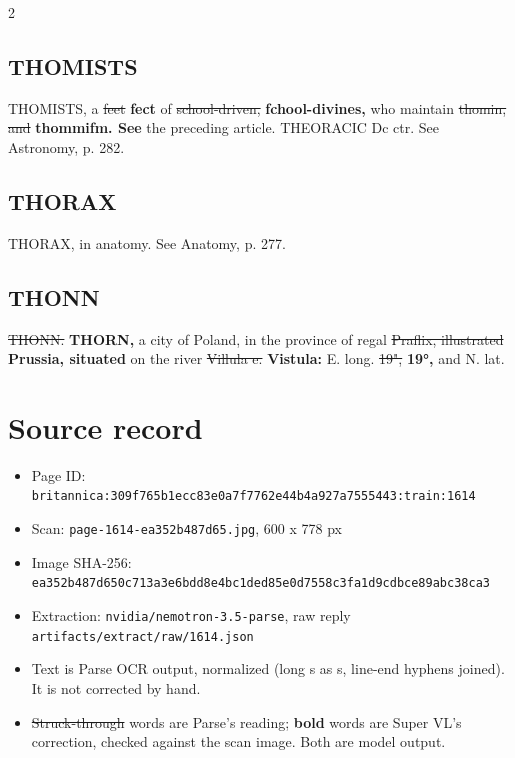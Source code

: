 \documentclass[10pt]{article}
\begin{document}
\begin{multicols}{2}
\subsection*{THOMISTS}
THOMISTS, a \sout{feet} \textbf{fect} of \sout{school-driven,} \textbf{fchool-divines,} who maintain \sout{thomin, and} \textbf{thommifm. See} the preceding article. THEORACIC Dc ctr. See Astronomy, p. 282.

\subsection*{THORAX}
THORAX, in anatomy. See Anatomy, p. 277.

\subsection*{THONN}
\sout{THONN.} \textbf{THORN,} a city of Poland, in the province of regal \sout{Praflix, illustrated} \textbf{Prussia, situated} on the river \sout{Villula e.} \textbf{Vistula:} E. long. \sout{19",} \textbf{19°,} and N. lat.
\end{multicols}
\section*{Source record}
\begin{itemize}
\item Page ID: \texttt{britannica:309f765b1ecc83e0a7f7762e44b4a927a7555443:train:1614}
\item Scan: \texttt{page-1614-ea352b487d65.jpg}, 600 x 778 px
\item Image SHA-256: \texttt{\small ea352b487d650c713a3e6bdd8e4bc1ded85e0d7558c3fa1d9cdbce89abc38ca3}
\item Extraction: \texttt{nvidia/nemotron-3.5-parse}, raw reply \texttt{artifacts/extract/raw/1614.json}
\item Text is Parse OCR output, normalized (long s as s, line-end hyphens joined). It is not corrected by hand.
\item \sout{Struck-through} words are Parse's reading; \textbf{bold} words are Super VL's correction, checked against the scan image. Both are model output.
\end{itemize}
\end{document}
